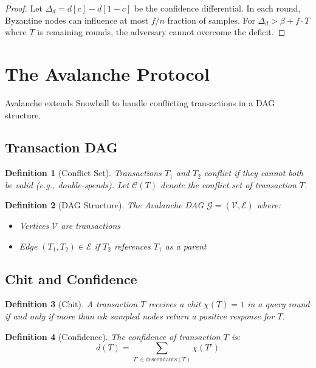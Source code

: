 \documentclass[11pt,a4paper]{article}
\newtheorem{definition}{Definition}
\begin{document}
\begin{proof}
Let $\Delta_d = d[c] - d[1-c]$ be the confidence differential. In each round, Byzantine nodes can influence at most $f/n$ fraction of samples. For $\Delta_d > \beta + f \cdot T$ where $T$ is remaining rounds, the adversary cannot overcome the deficit.
\end{proof}

\section{The Avalanche Protocol}

Avalanche extends Snowball to handle conflicting transactions in a DAG structure.

\subsection{Transaction DAG}

\begin{definition}[Conflict Set]
Transactions $T_1$ and $T_2$ conflict if they cannot both be valid (e.g., double-spends). Let $\mathcal{C}(T)$ denote the conflict set of transaction $T$.
\end{definition}

\begin{definition}[DAG Structure]
The Avalanche DAG $\mathcal{G} = (\mathcal{V}, \mathcal{E})$ where:
\begin{itemize}
    \item Vertices $\mathcal{V}$ are transactions
    \item Edge $(T_1, T_2) \in \mathcal{E}$ if $T_2$ references $T_1$ as a parent
\end{itemize}
\end{definition}

\subsection{Chit and Confidence}

\begin{definition}[Chit]
A transaction $T$ receives a chit $\chi(T) = 1$ in a query round if and only if more than $\alpha k$ sampled nodes return a positive response for $T$.
\end{definition}

\begin{definition}[Confidence]
The confidence of transaction $T$ is:
\begin{equation}
d(T) = \sum_{T' \in \text{descendants}(T)} \chi(T')
\end{equation}
\end{definition}
\end{document}
